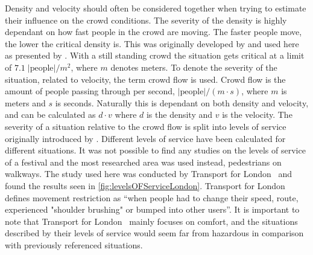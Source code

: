 Density and velocity should often be considered together when trying to estimate their influence on the crowd conditions. The severity of the density is highly dependant on how fast people in the crowd are moving. The faster people move, the lower the critical density is. This was originally developed by \citet{crowdDistasters} and used here as presented by \citet{wirz2013probing}. With a still standing crowd the situation gets critical at a limit of $7.1\; |\text{people}| / m^2$, where $m$ denotes meters. To denote the severity of the situation, related to velocity, the term crowd flow is used. Crowd flow is the amount of people passing through per second, $|\text{people}| / (m \cdot s)$, where $m$ is meters and $s$ is seconds. Naturally this is dependant on both density and velocity, and can be calculated as ${d} \cdot {v}$ where $d$ is the density and $v$ is the velocity. The severity of a situation relative to the crowd flow is split into levels of service originally introduced by \citet{crowdDistasters}. Different levels of service have been calculated for different situations. It was not possible to find any studies on the levels of service of a festival and the most researched area was used instead, pedestrians on walkways. The study used here was conducted by Transport for London~\cite{levelsOfServiceLondon} and found the results seen in \cref{fig:levelsOFServiceLondon}. Transport for London~\cite{levelsOfServiceLondon} defines movement restriction as \enquote{when people had to change their speed, route, experienced "shoulder brushing" or bumped into other users}. It is important to note that Transport for London~\cite{levelsOfServiceLondon} mainly focuses on comfort, and the situations described by their levels of service would seem far from hazardous in comparison with previously referenced situations.


